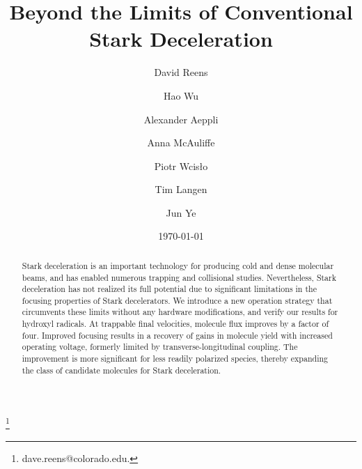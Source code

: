 \documentclass[%
 reprint,
 amsmath,amssymb,
 aps,
prl,
]{revtex4-1}
\begin{document}
\title{Beyond the Limits of Conventional Stark Deceleration}%

\author{David Reens}
\thanks{dave.reens@colorado.edu.}


\author{Hao Wu}

\author{Alexander Aeppli}
\author{Anna McAuliffe}

\author{Piotr Wcis\l o}

\author{Tim Langen}%

\author{Jun Ye}


\date{\today}



\begin{abstract}
Stark deceleration is an important technology for producing cold and dense molecular beams, and has enabled numerous trapping and collisional studies.
Nevertheless, Stark deceleration has not realized its full potential due to significant limitations in the focusing properties of Stark decelerators.
We introduce a new operation strategy that circumvents these limits without any hardware modifications, and verify our results for hydroxyl radicals.
At trappable final velocities, molecule flux improves by a factor of four.
Improved focusing results in a recovery of gains in molecule yield with increased operating voltage, formerly limited by transverse-longitudinal coupling.
The improvement is more significant for less readily polarized species, thereby expanding the class of candidate molecules for Stark deceleration.
\end{abstract}
\end{document}
